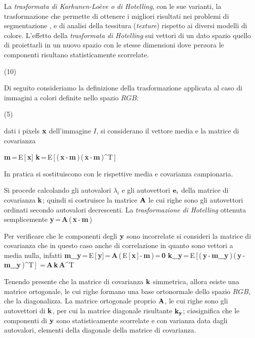La {\it trasformata di Karhunen-Lo\`eve o di Hotelling}, con le sue varianti, \e la trasformazione
che permette di ottenere i migliori risultati nei problemi di segmentazione  \cite{Lee},
\cite{Schmid} e di analisi della tessitura ({\it texture}) \cite{Wouver} rispetto ai diversi 
modelli di colore.
L'effetto della {\it trasformata di Hotelling} sui vettori di un dato spazio \e quello di
proiettarli in un nuovo spazio con le stesse dimensioni dove per\o ora le componenti 
risultano statisticamente scorrelate.

\vs(10)

Di seguito consideriamo la definizione della trasformazione applicata al caso di 
immagini a colori definite nello spazio $RGB$:

\vs(5)

dati i pixels ${\bf x}$ dell'immagine $I$, si considerano il vettore media e
la matrice di covarianza

\be
{\bf m}\,=\,E\,[\,{\bf x}]
\ee
\be
{\bf k}\,=\,E\,[\,(\,{\bf x}\,-\,{\bf m}\,)\,(\,{\bf x}\,-\,{\bf m}\,)^T\,]
\ee

In pratica si sostituiscono con le rispettive media e covarianza campionaria.

Si procede calcolando gli autovalori $\lambda_i$ e gli autovettori ${\bf e}_i$ della
matrice di covarianza ${\bf k}$; quindi si costruisce la matrice ${\bf A}$ le cui righe
sono gli autovettori ordinati secondo autovalori decrescenti.
La {\it trasformazione di Hotelling} \e ottenuta semplicemente
\be
{\bf y}\,=\,{\bf A}\,(\,{\bf x}\,-\,{\bf m}\,)
\ee

Per verificare che le componenti degli ${\bf y}$ sono incorrelate si consideri la 
matrice di covarianza che in questo caso \e anche di correlazione in quanto sono
vettori a media nulla, infatti
\be
{\bf m_y}\,=\,E\,[\,{\bf y}]\,=\,{\bf A}\,(\,E\,[\,{\bf x}\,]\,-\,{\bf m}\,)\,=\,{\bf 0}
\ee
\be
{\bf k_y}\,=\,E\,[\,(\,{\bf y}\,-\,{\bf m_y}\,)\,(\,{\bf y}\,-\,{\bf m_y}\,)^T\,]
\,=\,{\bf A}\,{\bf k}\,{\bf A}^T
\ee

Tenendo presente che la matrice di covarianza ${\bf k}$ \e simmetrica, allora esiste
una matrice ortogonale, le cui righe formano una base ortonormale dello spazio $RGB$,
che la diagonalizza. 
La matrice ortogonale \e proprio ${\bf A}$, le cui righe sono gli autovettori di ${\bf k}$,
per cui la matrice diagonale risultante \e ${\bf k_y}$; ci\o significa che
le componenti di ${\bf y}$ sono statisticamente scorrelate e con varianza data
dagli autovalori, elementi della diagonale della matrice di covarianza.

